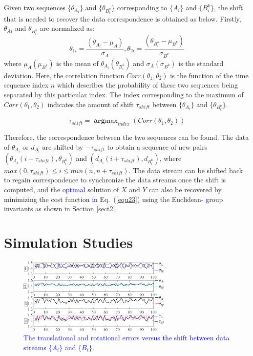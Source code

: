 \documentclass[letterpaper, 10 pt, conference]{ieeeconf}  %
\begin{document}
Given two sequences $\{\theta_{A_{i}}\}$ and $\{\theta_{B_{i}^{k}}\}$ corresponding to  $\{A_{i}\}$ and $\{B_{i}^{k}\}$, the shift that is needed to recover the data correspondence is obtained as below.
Firstly, $\theta_{Ai}$ and $\theta_{B_{i}^{k}}$ are normalized as:
{\color{red}
\begin{equation}\label{equ29}
    \theta_{1i}=\frac{(\theta_{A_{i}}-\mu_{A})}{\sigma_{A}}, \theta_{2i}=\frac{(\theta_{B_{i}^{k}}-\mu_{B^{k}})}{\sigma_{B^{k}}}
\end{equation}
where $\mu_{A}(\mu_{B^{k}})$ is the mean of $\theta_{A_{i}}(\theta_{B_{i}^{k}})$ and $\sigma_{A}(\sigma_{B^{k}})$ is the standard deviation.
}
Here, the correlation function $Corr(\theta_{1},\theta_{2})$  is the function of the time sequence index $n$ which describes the probability of these two sequences being separated by this particular index. The index corresponding to the maximum of $Corr(\theta_{1},\theta_{2})$  indicates the amount of shift $\tau_{shift}$ between $\{\theta_{A_{i}}\}$ and $\{\theta_{B_{i}^{k}}\}$.

\begin{equation}\label{equ30}
    \tau_{shift} = \mathop{\mathbf{arg}max}_{index}(Corr(\theta_{1},\theta_{2}))
\end{equation}

Therefore, the correspondence between the two sequences can be found. The data of ${\theta_{A_{i}}}$ or ${d_{A_{i}}}$ are shifted by $-\tau_{shift}$ to obtain a sequence of new pairs $({\theta_{A_{i}}(i+\tau_{shift})},{\theta_{B_{i}^{k}}})$ and $({d_{A_{i}}(i+\tau_{shift})},{d_{B_{i}^{k}}})$, where $max(0,\tau_{shift})\leq i \leq min(n,n+\tau_{shift})$. The data stream can be shifted back to regain correspondence to synchronize the data streams once the shift is computed, and the \textcolor{blue}{optimal} %
solution of $X$ and $Y$ can also be recovered by minimizing the cost function \textcolor{blue}{in} Eq.\textcolor{blue}{~}(\ref{equ23}) using the Euclidean-%
\textcolor{blue}{g}roup invariants as shown in Section \ref{sect2}.


\section{Simulation Studies}
\label{sect4}

\begin{figure}[t!]
\centering
\includegraphics[width=3in]{fig2.eps}
\caption{
\textcolor{blue}{The translational and rotational errors versus the shift between data streams $\{A_i\}$ and $\{B_i\}$.} 
}
\label{fig2}
\end{figure}
\end{document}
